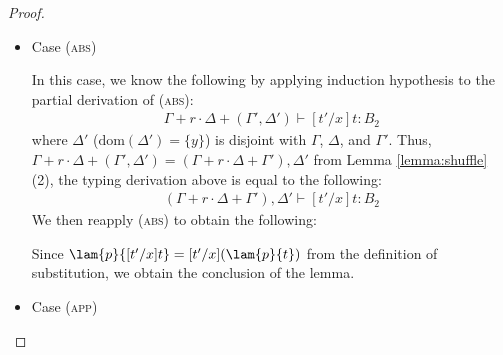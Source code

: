 \begin{proof}
\begin{itemize}
\item Case (\textsc{abs})
\begin{center}
    \begin{minipage}{.8\linewidth}
    \end{minipage}
\end{center}
In this case, we know the following by applying induction hypothesis to the partial derivation of (\textsc{abs}):
\begin{align*}
    \Gamma + r\cdot\Delta + (\Gamma', \Delta') \vdash [t'/x]t : B_2
\end{align*}
where $\Delta'$ ($\mathrm{dom}(\Delta') = \{y\}$) is disjoint with $\Gamma$, $\Delta$, and $\Gamma'$.
Thus, $\Gamma + r\cdot\Delta + (\Gamma', \Delta') = (\Gamma + r\cdot\Delta + \Gamma'), \Delta'$ from Lemma \ref{lemma:shuffle} (2), the typing derivation above is equal to the following:
\begin{align*}
    (\Gamma + r\cdot\Delta + \Gamma'), \Delta' \vdash [t'/x]t : B_2
\end{align*}
We then reapply (\textsc{abs}) to obtain the following:
\begin{center}
    \begin{minipage}{.80\linewidth}
    \end{minipage}
\end{center}
Since $\lam{p}{[t'/x]t}=[t'/x](\lam{p}{t})$ from the definition of substitution, we obtain the conclusion of the lemma.\\


\item Case (\textsc{app})
\begin{center}
    \begin{minipage}{.75\linewidth}
    \end{minipage}
\end{center}


\end{itemize}
\end{proof}
